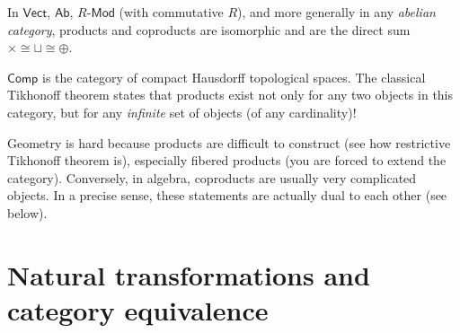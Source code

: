 \begin{example}
In $\mathsf{Vect}$, $\mathsf{Ab}$, $R\text{-}\mathsf{Mod}$ (with commutative $R$), and more generally in any \emph{abelian category}, products and coproducts are isomorphic and are the direct sum $\times\cong\sqcup\cong\oplus$.
\end{example}
%
\begin{example}
$\mathsf{Comp}$ is the category of compact Hausdorff topological
spaces. The classical Tikhonoff theorem states that products exist
not only for any two objects in this category, but for any \emph{infinite}
set of objects (of any cardinality)!
\end{example}
%
\begin{rem}
Geometry is hard because products are difficult to construct (see
how restrictive Tikhonoff theorem is), especially fibered products
(you are forced to extend the category). Conversely, in algebra, coproducts
are usually very complicated objects. In a precise sense, these statements
are actually dual to each other (see below).
\end{rem}



\section{Natural transformations and category equivalence}

